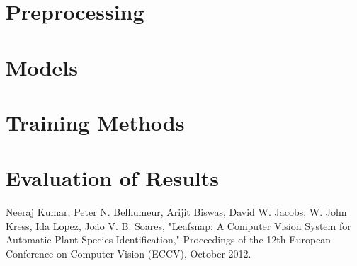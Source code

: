 \documentclass[12pt]{article}
\begin{document}
\section{Preprocessing}

\section{Models}

\section{Training Methods}

\section{Evaluation of Results}

\begin{thebibliography}{99}
 Neeraj Kumar, Peter N. Belhumeur, Arijit Biswas, David W. Jacobs, W. John Kress, Ida Lopez, Jo\~{a}o V. B. Soares, "Leafsnap: A Computer Vision System for Automatic Plant Species Identification," Proceedings of the 12th European Conference on Computer Vision (ECCV), October 2012.
\end{thebibliography}
\end{document}
